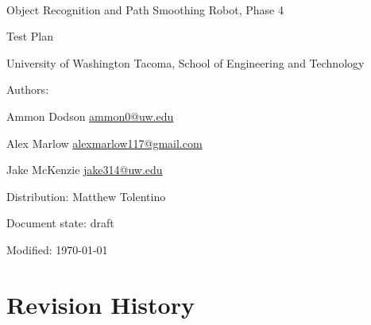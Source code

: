 \documentclass[english,12pt]{article}
\begin{document}
\begin{center}

\thispagestyle{empty}

$ $

\vspace{250pt}

\begin{bfseries}

{\Large Object Recognition and Path Smoothing Robot, Phase 4}

{\Huge Test Plan}


\end{bfseries}

\vspace{180pt}

University of Washington Tacoma, School of Engineering and Technology


\vspace{12pt}

Authors: 

Ammon Dodson \href{mailto:ammon0@uw.edu}{ammon0@uw.edu} 

Alex Marlow \href{mailto:alexmarlow117@gmail.com}{alexmarlow117@gmail.com} 

Jake McKenzie \href{mailto:jake314@uw.edu}{jake314@uw.edu}

Distribution: Matthew Tolentino

Document state: draft

Modified: \today

\end{center}

\newpage


\tableofcontents

\newpage


\section{Revision History}
\end{document}
